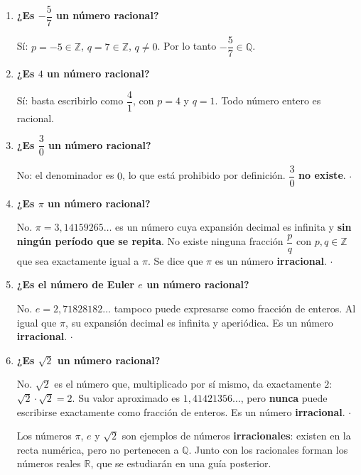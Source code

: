 \documentclass[11pt, letterpaper]{article}
\begin{document}
\begin{tcolorbox}[examplebox, title={Ejemplos --- identificar n\'umeros racionales}]
\begin{enumerate}[label=\textbf{Ej. \arabic*.}, leftmargin=*, itemsep=12pt]

\item \textbf{¿Es $-\dfrac{5}{7}$ un n\'umero racional?}

S\'i: $p = -5 \in \mathbb{Z}$, $q = 7 \in \mathbb{Z}$, $q \neq 0$. Por lo tanto $-\dfrac{5}{7} \in \mathbb{Q}$. \checkmark

\item \textbf{¿Es $4$ un n\'umero racional?}

S\'i: basta escribirlo como $\dfrac{4}{1}$, con $p=4$ y $q=1$. Todo n\'umero entero es racional. \checkmark

\item \textbf{¿Es $\dfrac{3}{0}$ un n\'umero racional?}

No: el denominador es $0$, lo que est\'a prohibido por definici\'on. $\dfrac{3}{0}$ \textbf{no existe}. $\cdot$

\item \textbf{¿Es $\pi$ un n\'umero racional?}

No. $\pi = 3{,}14159265\ldots$ es un n\'umero cuya expansi\'on decimal es infinita y \textbf{sin ning\'un per\'iodo que se repita}. No existe ninguna fracci\'on $\dfrac{p}{q}$ con $p,q\in\mathbb{Z}$ que sea exactamente igual a $\pi$. Se dice que $\pi$ es un n\'umero \textbf{irracional}. $\cdot$

\item \textbf{¿Es el n\'umero de Euler $e$ un n\'umero racional?}

No. $e = 2{,}71828182\ldots$ tampoco puede expresarse como fracci\'on de enteros. Al igual que $\pi$, su expansi\'on decimal es infinita y aperiódi\-ca. Es un n\'umero \textbf{irracional}. $\cdot$

\item \textbf{¿Es $\sqrt{2}$ un n\'umero racional?}

No. $\sqrt{2}$ es el n\'umero que, multiplicado por s\'i mismo, da exactamente $2$: $\sqrt{2}\cdot\sqrt{2}=2$. Su valor aproximado es $1{,}41421356\ldots$, pero \textbf{nunca} puede escribirse exactamente como fracci\'on de enteros. Es un n\'umero \textbf{irracional}. $\cdot$

\medskip
\begin{tcolorbox}[importantbox, title={Nota --- Los irracionales no son racionales}]
Los n\'umeros $\pi$, $e$ y $\sqrt{2}$ son ejemplos de n\'umeros \textbf{irracionales}: existen en la recta num\'erica, pero no pertenecen a $\mathbb{Q}$. Junto con los racionales forman los n\'umeros reales $\mathbb{R}$, que se estudiar\'an en una gu\'ia posterior.
\end{tcolorbox}

\end{enumerate}
\end{tcolorbox}
\end{document}
